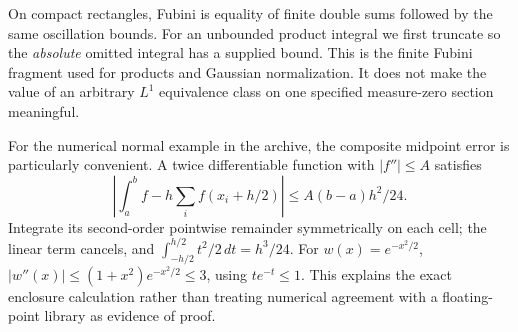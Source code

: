 On compact rectangles, Fubini is equality of finite double sums followed by
the same oscillation bounds. For an unbounded product integral we first
truncate so the \emph{absolute} omitted integral has a supplied bound. This
is the finite Fubini fragment used for products and Gaussian normalization.
It does not make the value of an arbitrary $L^1$ equivalence class on one
specified measure-zero section meaningful.

For the numerical normal example in the archive, the composite midpoint
error is particularly convenient. A twice differentiable function with
$|f''|\le A$ satisfies
\[
 \left|\int_a^b f-h\sum_i f(x_i+h/2)\right|
 \le A(b-a)h^2/24.
\]
Integrate its second-order pointwise remainder symmetrically on each cell;
the linear term cancels, and $\int_{-h/2}^{h/2}t^2/2\,dt=h^3/24$.
For $w(x)=e^{-x^2/2}$,
$|w''(x)|\le (1+x^2)e^{-x^2/2}\le3$, using $te^{-t}\le1$.
This explains the exact enclosure calculation rather than treating numerical
agreement with a floating-point library as evidence of proof.
